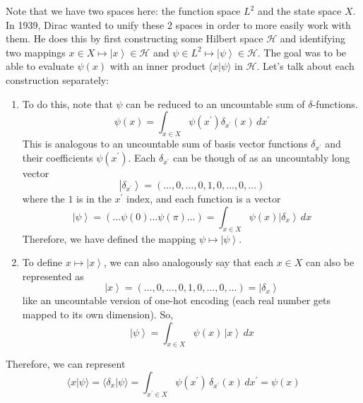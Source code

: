 \documentclass{article}
\newcommand{\ket}[1]{\ensuremath{\left|#1\right\rangle}}
\newcommand{\braket}[2]{\langle #1 | #2 \rangle}
\begin{document}
      Note that we have two spaces here: the function space $L^2$ and the state space $X$. In 1939, Dirac wanted to unify these 2 spaces in order to more easily work with them. He does this by first constructing some Hilbert space $\mathcal{H}$ and identifying two mappings $x \in X \mapsto \ket{x} \in \mathcal{H}$ and $\psi \in L^2 \mapsto \ket{\psi} \in \mathcal{H}$. The goal was to be able to evaluate $\psi(x)$ with an inner product $\braket{x}{\psi}$ in $\mathcal{H}$. Let's talk about each construction separately: 
      \begin{enumerate} 
        \item To do this, note that $\psi$ can be reduced to an uncountable sum of $\delta$-functions. 
          \begin{equation} 
            \psi(x) = \int_{x \in X} \psi(x^\prime) \delta_{x^\prime} (x) \,dx^\prime 
          \end{equation}
        This is analogous to an uncountable sum of basis vector functions $\delta_{x^\prime}$ and their coefficients $\psi(x^\prime)$. Each $\delta_{x^\prime}$ can be though of as an uncountably long vector 
        \begin{equation} 
          \ket{\delta_{x^\prime}} = (\ldots, 0, \ldots, 0, 1, 0, \ldots, 0, \ldots)
        \end{equation}
        where the $1$ is in the $x^\prime$ index, and each function is a vector 
        \begin{equation} 
          \ket{\psi} = (\ldots \psi(0) \ldots \psi(\pi) \ldots) = \int_{x \in X} \psi(x) \ket{\delta_x} \,dx 
        \end{equation}
        Therefore, we have defined the mapping $\psi \mapsto \ket{\psi}$. 

      \item To define $x \mapsto \ket{x}$, we can also analogously say that each $x \in X$ can also be represented as 
        \begin{equation} 
          \ket{x} = (\ldots, 0, \ldots, 0, 1, 0, \ldots, 0, \ldots) = \ket{\delta_x}
        \end{equation}
        like an uncountable version of one-hot encoding (each real number gets mapped to its own dimension). So, 
        \begin{equation} 
          \ket{\psi} = \int_{x \in X} \psi(x) \, \ket{x} \,dx 
        \end{equation}
      \end{enumerate}

      Therefore, we can represent 
      \begin{equation} 
        \braket{x}{\psi} = \braket{\delta_x}{\psi} = \int_{x^\prime \in X} \psi(x^\prime) \, \delta_{x^\prime}(x) \,dx^\prime = \psi(x) 
      \end{equation}
\end{document}
